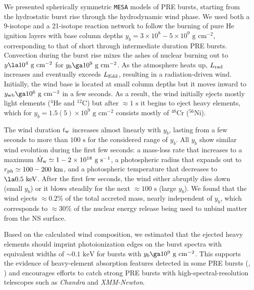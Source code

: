 \documentclass[apj,usenatbib, iop, twocolappendix]{emulateapj}
\newcommand{\Lrad}{L_{\rm rad}}
\newcommand{\Mdot}{\dot{M}_{\rm w}}
\newcommand{\Ledd}{L_{\rm Edd}}
\newcommand{\trm}[1]{\textrm{#1}}
\begin{document}
We presented spherically symmetric \texttt{MESA} models of PRE bursts, starting from the hydrostatic burst rise through the hydrodynamic wind phase.  We used both a  9-isotope and a 21-isotope reaction network to follow the burning of pure He ignition layers with base column depths $y_b=3\times10^8 - 5\times10^9\trm{ g cm}^{-2}$, corresponding to that of short through intermediate duration PRE bursts.  Convection during the burst rise mixes the ashes of nuclear burning out to $y\la 10^4\trm{ g cm}^{-2}$ for $y_b\ga10^9\trm{ g cm}^{-2}$. As the atmosphere heats up, $\Lrad$ increases and eventually exceeds $\Ledd$, resulting in a radiation-driven wind.   Initially, the wind base is located at 
small column depths but it moves inward to $y_{\rm wb}\ga10^6\trm{ g cm}^{-2}$ in a few seconds. As a result, the wind initially ejects mostly light elements ($^4$He and $^{12}$C) but after $\approx 1\trm{ s}$ it begins to eject heavy elements, which  for $y_b=1.5(5)\times10^9\trm{ g cm}^{-2}$ consists mostly of $^{48}$Cr ($^{56}$Ni).

The wind duration $t_{\rm w}$ increases almost linearly with $y_b$, lasting from a few seconds to more than $100\trm{ s}$ for the considered range of $y_b$.  All $y_b$ show similar wind evolution during the first few seconds: a mass-loss rate that increases to a maximum $\Mdot \simeq 1-2\times10^{18}\trm{ g s}^{-1}$, a photospheric radius that expands out to $r_{\rm ph}\simeq 100-200\trm{ km}$, and a photospheric temperature that  decreases to $\la 0.5\trm{ keV}$.  After the first few seconds, the wind either abruptly dies down (small $y_b$) or it blows steadily for the next $\approx 100\trm{ s}$ (large $y_b$). We found that  the wind ejects $\approx 0.2\%$ of the total accreted mass, nearly independent of $y_b$, which corresponds to $\approx 30\%$ of the nuclear energy release being used to unbind matter from the NS surface.  

Based on the calculated wind composition, we estimated that the ejected heavy elements should imprint photoionization edges on the burst spectra with equivalent widths of $\sim 0.1\trm{ keV}$ for bursts with $y_b\ga 10^9\trm{ g cm}^{-2}$. This supports the evidence of heavy-element absorption features detected in some PRE bursts  (, \citealt{Barriere:15, Iwai:17, Kajava:17}) and encourages efforts to catch strong PRE bursts with high-spectral-resolution telescopes such as {\it Chandra} and {\it XMM-Newton}. 
\end{document}
